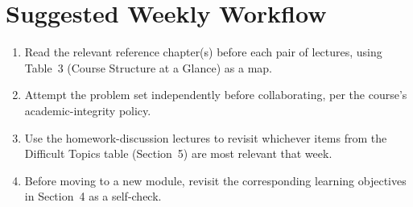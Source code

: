 \documentclass[11pt]{article}
\begin{document}
\section{Suggested Weekly Workflow}
\begin{enumerate}[leftmargin=*]
  \item Read the relevant reference chapter(s) before each pair of lectures, using Table~3 (Course Structure at a Glance) as a map.
  \item Attempt the problem set independently before collaborating, per the course's academic-integrity policy.
  \item Use the homework-discussion lectures to revisit whichever items from the Difficult Topics table (Section~5) are most relevant that week.
  \item Before moving to a new module, revisit the corresponding learning objectives in Section~4 as a self-check.
\end{enumerate}
\end{document}
